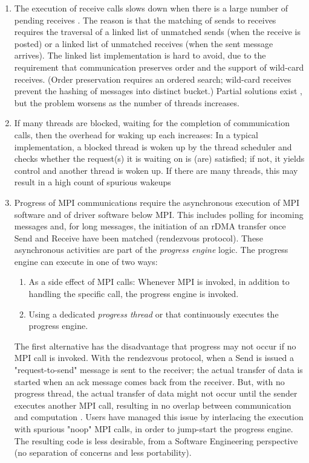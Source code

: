 \begin{enumerate}
			\item 
			The execution of receive calls slows down when there is a large 
			number of pending receives 
			\cite{brightwellseastarqueue,ferreira2017characterizing}. The 
			reason is that the 
			matching of sends to receives requires the traversal of a linked 
			list of unmatched sends (when the receive is posted) or a linked 
			list of unmatched receives (when the sent message arrives). The 
			linked list implementation is hard to avoid, due to the requirement 
			that communication preserves order and the support of wild-card 
			receives. (Order preservation requires an ordered search; wild-card 
			receives prevent the hashing of messages into distinct 
			bucket.) Partial solutions exist \cite{m5}, but the problem worsens 
			as the number of threads increases.
			\item 
			If many threads are blocked, waiting for the completion of 
			communication calls, then the overhead for waking up each
			increases: In a typical implementation, a blocked thread is woken 
			up by the thread scheduler and checks whether the request(s) it is 
			waiting on is (are) satisfied; if not, it yields control and 
			another 
			thread is woken up. If there are many threads, this may result in a 
			high count of spurious wakeups \cite{dang2017advanced}
			\item 
			Progress of MPI communications require the asynchronous execution 
			of MPI software and of driver software below MPI. This includes 
			polling for incoming messages and, for long messages, the 
			initiation of an rDMA transfer once Send and Receive have been 
			matched (rendezvous protocol). These asynchronous activities are 
			part of the \emph{progress engine} logic. The progress engine can 
			execute in one of two ways:
			\begin{enumerate}
				\item
				As a side effect of  MPI calls: Whenever MPI is invoked, in 
				addition to handling the specific call, the progress engine is 
				invoked.
				\item 
				Using a dedicated \emph{progress thread} or that continuously 
				executes the progress engine.
						\end{enumerate}
			The first alternative has the disadvantage that progress may not 
			occur if no MPI call is invoked. With the rendezvous protocol, when 
			a Send is issued a "request-to-send" message is sent to the 
			receiver; the actual transfer of data is started when an ack 
			message comes back from the receiver. But, with no progress thread, 
			the actual transfer of data might not occur until the sender 
			executes 
			another MPI call, resulting in no overlap between communication and 
			computation \cite{Denis2016mpioverlap}. Users have managed this 
			issue by interlacing the 
			execution with spurious "noop" MPI calls, in order to jump-start 
			the progress engine. The resulting code is less desirable, from a 
			Software Engineering perspective (no separation of concerns and 
			less portability).
			

\end{enumerate}
